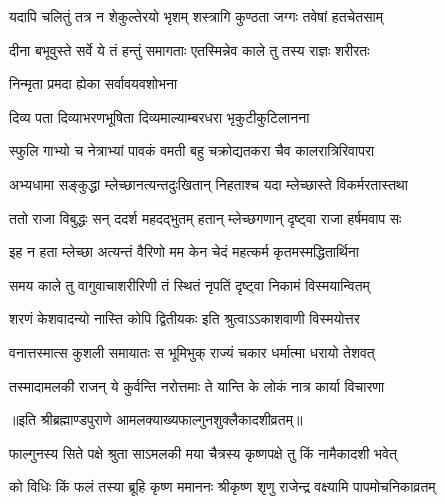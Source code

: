 \twolineshloka
{यदापि चलितुं तत्र न शेकुल्तेरयो भृशम्}
{शस्त्रागि कुण्ठता जग्गः तवेषां हतचेतसाम्} %

\twolineshloka
{दीना बभूवुस्ते सर्वे ये तं हन्तुं समागताः}
{एतस्मिन्नेव काले तु तस्य राज्ञः शरीरतः} %

\onelineshloka
{निन्मृता प्रमदा ह्येका सर्वावयवशोभना} %

\twolineshloka
{दिव्य पता दिव्याभरणभूषिता}
{दिव्यमाल्याम्बरधरा भृकुटीकुटिलानना} %

\twolineshloka
{स्फुलि गाभ्यो च नेत्राभ्यां पावकं वमती बहु}
{चक्रोद्यतकरा चैव कालरात्रिरिवापरा} %

\twolineshloka
{अभ्यधामा सङ्कुद्धा म्लेच्छानत्यन्तदुःखितान्}
{निहताश्च यदा म्लेच्छास्ते विकर्मरतास्तथा} %

\twolineshloka
{ततो राजा विबुद्धः सन् ददर्श महदद्भुतम्}
{हतान् म्लेच्छगणान् दृष्ट्वा राजा हर्षमवाप सः} %

\twolineshloka
{इह न हता म्लेच्छा अत्यन्तं वैरिणो मम}
{केन चेदं महत्कर्म कृतमस्मद्धितार्थिना} %

\twolineshloka
{समय काले तु वागुवाचाशरीरिणी}
{तं स्थितं नृपतिं दृष्ट्वा निकामं विस्मयान्वितम्} %

\twolineshloka
{शरणं केशवादन्यो नास्ति कोपि द्वितीयकः}
{इति श्रुत्वाऽऽकाशवाणी विस्मयोत्तर} %

\twolineshloka
{वनात्तस्मात्स कुशली समायातः स भूमिभुक्}
{राज्यं चकार धर्मात्मा धरायो तेशवत्} %


\twolineshloka
{तस्मादामलकी राजन् ये कुर्वन्ति नरोत्तमाः}
{ते यान्ति के लोकं नात्र कार्या विचारणा} %

॥इति श्रीब्रह्माण्डपुराणे आमलक्याख्यफाल्गुनशुक्लैकादशीव्रतम्॥


\hyperref[sec:ekadashi_mahatmyam_vrata_raja]{\closesub}
\clearpage

\label{sec:vrata-raja-chaitra-krishna-papamochani}


\twolineshloka
{फाल्गुनस्य सिते पक्षे श्रुता साऽमलकी मया}
{चैत्रस्य कृष्णपक्षे तु किं नामैकादशी भवेत्} %

\twolineshloka
{को विधिः किं फलं तस्या ब्रूहि कृष्ण ममाननः}
{श्रीकृष्ण शृणु राजेन्द्र वक्ष्यामि पापमोचनिकाव्रतम्} %



